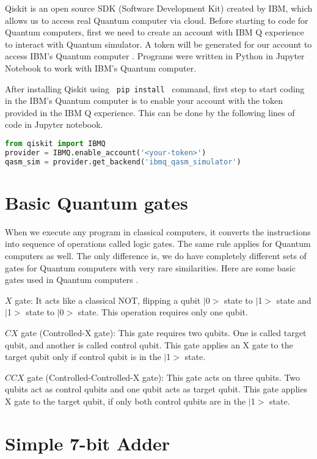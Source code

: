 \documentclass{cpp}
\begin{document}
Qiskit is an open source SDK (Software Development Kit) created by IBM, which allows us to access real Quantum computer via cloud. %
Before starting to code for Quantum computers, first we need to create an account with IBM Q experience to interact with Quantum simulator. A token will be generated for our account to access IBM’s Quantum computer \cite{sashwat_simple_adder}. Programs were written in Python in Jupyter Notebook to work with IBM's Quantum computer.

After installing Qiskit using \texttt{ pip install } command, first step to start coding in the IBM’s Quantum computer is to enable your account with the token provided in the IBM Q experience. This can be done by the following lines of code in Jupyter notebook.

\begin{lstlisting}[language=Python]
from qiskit import IBMQ
provider = IBMQ.enable_account('<your-token>')
qasm_sim = provider.get_backend('ibmq_qasm_simulator')
\end{lstlisting}

\section{Basic Quantum gates}
When we execute any program in classical computers, it converts the instructions into sequence of operations called logic gates. The same rule applies for Quantum computers as well. The only difference is, we do have completely different sets of gates for Quantum computers with very rare similarities. Here are some basic gates used in Quantum computers \cite{quantum_gates_book_ibm}. 

$X$ gate: It acts like a classical NOT, flipping a qubit $|$0$>$ state to $|$1$>$  state and $|$1$>$  state to $|$0$>$ state. This operation requires only one qubit. 

$CX$ gate (Controlled-X gate): This gate requires two qubits. One is called target qubit, and another is called control qubit. This gate applies an X gate to the target qubit only if control qubit is in the $|$1$>$ state.

\newpage
$CCX$ gate (Controlled-Controlled-X gate): This gate acts on three qubits. Two qubits act as control qubits and one qubit acts as target qubit. This gate applies X gate to the target qubit, if only both control qubits are in the $|$1$>$ state.


\section{Simple 7-bit Adder}
\end{document}

